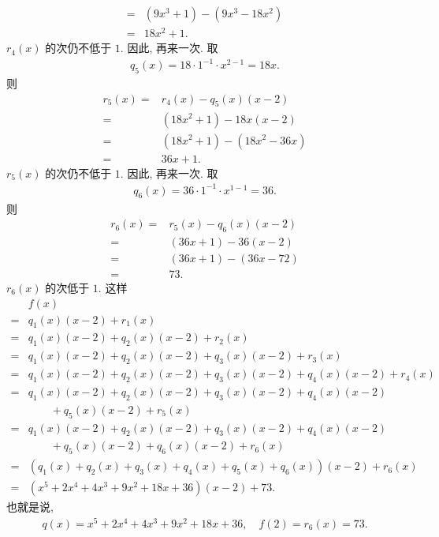 \begin{example}
\begin{align*}
        = {} & (9x^3 + 1) - (9x^3 - 18x^2) \\
        = {} & 18x^2 + 1.
    \end{align*}
    $r_4 (x)$ 的次仍不低于 $1$. 因此, 再来一次. 取
    \begin{align*}
        q_5 (x) = 18 \cdot 1^{-1} \cdot x^{2-1} = 18x.
    \end{align*}
    则
    \begin{align*}
        r_5 (x)
        = {} & r_4 (x) - q_5 (x) (x - 2)   \\
        = {} & (18x^2 + 1) - 18x (x - 2)   \\
        = {} & (18x^2 + 1) - (18x^2 - 36x) \\
        = {} & 36x + 1.
    \end{align*}
    $r_5 (x)$ 的次仍不低于 $1$. 因此, 再来一次. 取
    \begin{align*}
        q_6 (x) = 36 \cdot 1^{-1} \cdot x^{1-1} = 36.
    \end{align*}
    则
    \begin{align*}
        r_6 (x)
        = {} & r_5 (x) - q_6 (x) (x - 2) \\
        = {} & (36x + 1) - 36 (x - 2)    \\
        = {} & (36x + 1) - (36x - 72)    \\
        = {} & 73.
    \end{align*}
    $r_6 (x)$ 的次低于 $1$. 这样
    \begin{align*}
             & f(x)                                                                        \\
        = {} & q_1 (x) (x-2) + r_1 (x)                                                     \\
        = {} & q_1 (x) (x-2) + q_2 (x) (x-2) + r_2 (x)                                     \\
        = {} & q_1 (x) (x-2) + q_2 (x) (x-2) + q_3 (x) (x-2) + r_3 (x)                     \\
        = {} & q_1 (x) (x-2) + q_2 (x) (x-2) + q_3 (x) (x-2) + q_4 (x) (x-2) + r_4 (x)     \\
        = {} & q_1 (x) (x-2) + q_2 (x) (x-2) + q_3 (x) (x-2) + q_4 (x) (x-2)               \\
             & \qquad + q_5 (x) (x-2) + r_5 (x)                                            \\
        = {} & q_1 (x) (x-2) + q_2 (x) (x-2) + q_3 (x) (x-2) + q_4 (x) (x-2)               \\
             & \qquad + q_5 (x) (x-2) + q_6 (x) (x-2) + r_6 (x)                            \\
        = {} & (q_1 (x) + q_2 (x) + q_3 (x) + q_4 (x) + q_5 (x) + q_6 (x)) (x-2) + r_6 (x) \\
        = {} & (x^5 + 2x^4 + 4x^3 + 9x^2 + 18x + 36) (x-2) + 73.
    \end{align*}
    也就是说,
    \begin{align*}
        q(x) = x^5 + 2x^4 + 4x^3 + 9x^2 + 18x + 36, \quad f(2) = r_6 (x) = 73.
    \end{align*}
\end{example}
